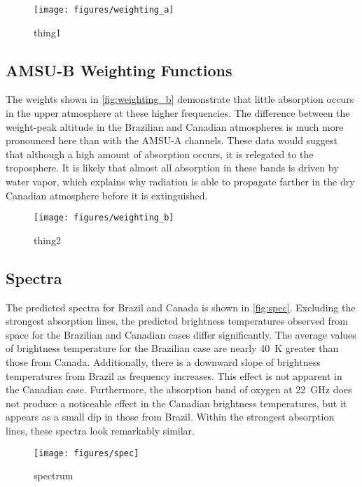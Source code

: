 \documentclass[twocol]{ametsoc}
\begin{document}
\begin{figure}
	\centering
	\texttt{[image: figures/weighting\_a]}
	\caption{thing1}
	\label{fig:weighting_a}
\end{figure}

\subsection{AMSU-B Weighting Functions}

The weights shown in \autoref{fig:weighting_b} demonstrate that little absorption occurs in the upper atmosphere at these higher frequencies.
The difference between the weight-peak altitude in the Brazilian and Canadian atmospheres is much more pronounced here than with the AMSU-A channels.
These data would suggest that although a high amount of absorption occurs, it is relegated to the troposphere.
It is likely that almost all absorption in these bands is driven by water vapor, which explains why radiation is able to propagate farther in the dry Canadian atmosphere before it is extinguished.

\begin{figure}
	\centering
	\texttt{[image: figures/weighting\_b]}
	\caption{thing2}
	\label{fig:weighting_b}
\end{figure}

\subsection{Spectra}

The predicted spectra for Brazil and Canada is shown in \autoref{fig:spec}.
Excluding the strongest absorption lines, the predicted brightness temperatures observed from space for the Brazilian and Canadian cases differ significantly.
The average values of brightness temperature for the Brazilian case are nearly 40~K greater than those from Canada.
Additionally, there is a downward slope of brightness temperatures from Brazil as frequency increases.
This effect is not apparent in the Canadian case.
Furthermore, the absorption band of oxygen at 22~GHz does not produce a noticeable effect in the Canadian brightness temperatures, but it appears as a small dip in those from Brazil.
Within the strongest absorption lines, these spectra look remarkably similar.

\begin{figure}
	\centering
	\texttt{[image: figures/spec]}
	\caption{spectrum}
	\label{fig:spec}
\end{figure}
\end{document}

